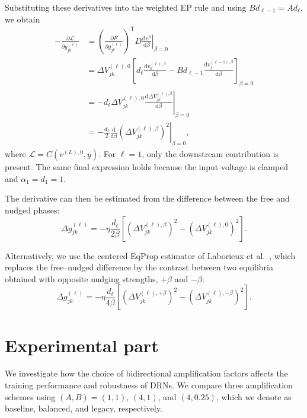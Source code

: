 \documentclass{article}
\begin{document}
Substituting these derivatives into the weighted EP rule and using
$B d_{\ell-1}=A d_\ell$, we obtain
\begin{equation}
\begin{aligned}
-\frac{\partial\mathcal L}{\partial g_{jk}^{(\ell)}}
&=
\left(\frac{\partial F}{\partial g_{jk}^{(\ell)}}\right)^{\mathsf T}
D
\left.\frac{\mathrm dv^\beta}{\mathrm d\beta}\right|_{\beta=0}
\\
&=
\Delta V_{jk}^{(\ell),0}
\left[
d_\ell\frac{\mathrm dv_k^{(\ell),\beta}}{\mathrm d\beta}
-
B d_{\ell-1}
\frac{\mathrm dv_j^{(\ell-1),\beta}}{\mathrm d\beta}
\right]_{\beta=0}
\\
&=
-d_\ell\Delta V_{jk}^{(\ell),0}
\left.
\frac{\mathrm d\Delta V_{jk}^{(\ell),\beta}}{\mathrm d\beta}
\right|_{\beta=0}
\\
&=
-\frac{d_\ell}{2}
\left.
\frac{\mathrm d}{\mathrm d\beta}
\left(\Delta V_{jk}^{(\ell),\beta}\right)^2
\right|_{\beta=0},
\end{aligned}
\label{eq:amp_vector_field_conductance_descent}
\end{equation}
where $\mathcal L=C(v^{(L),0},y)$.
For $\ell=1$, only the downstream contribution is present.
The same final expression holds because the input voltage is
clamped and $\alpha_1=d_1=1$.


The derivative can then be estimated from the difference between the free
and nudged phases:
\begin{equation}
\Delta g_{jk}^{(\ell)}
=
-\eta\frac{d_\ell}{2\beta}
\left[
\left(\Delta V_{jk}^{(\ell),\beta}\right)^2
-
\left(\Delta V_{jk}^{(\ell),0}\right)^2
\right].
\label{eq:amp_conductance_learning_rule}
\end{equation}

Alternatively, we use the centered EqProp estimator of
Laborieux et al.~\cite{laborieux2021scaling}, which replaces the free--nudged
difference by the contrast between two equilibria obtained with opposite
nudging strengths, $+\beta$ and $-\beta$:
\begin{equation}
\Delta g_{jk}^{(\ell)}
=
-\eta\frac{d_\ell}{4\beta}
\left[
\left(\Delta V_{jk}^{(\ell),+\beta}\right)^2
-
\left(\Delta V_{jk}^{(\ell),-\beta}\right)^2
\right].
\label{eq:amp_conductance_learning_rule_centered}
\end{equation}




\clearpage

\section{Experimental part}
\label{sec:selection_stage_conv_results}
We investigate how the choice of bidirectional amplification factors
affects the training performance and robustness of DRNs. We compare three amplification schemes using $(A,B)=(1,1)$,
$(4,1)$, and $(4,0.25)$, which we denote as
baseline, balanced, and legacy, respectively.
\end{document}
